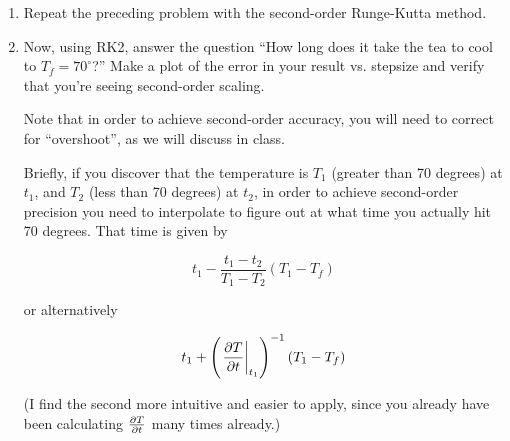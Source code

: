\documentclass[12pt]{article}
\def\PAR#1#2{ {{\partial #1}\over{\partial #2}} }
\begin{document}
\begin{enumerate}
\item{Repeat the preceding problem with the second-order Runge-Kutta method.}

\item{Now, using RK2, answer the question ``How long does it take the tea to cool to $T_f=70^\circ$?'' Make a plot of the error in your result vs. stepsize and verify that you're seeing second-order scaling. 

Note that in order to achieve second-order accuracy, you will need to correct for ``overshoot'', as we will discuss in class. 

Briefly, if you discover that the temperature is $T_1$ (greater than 70 degrees) at $t_1$, and $T_2$ (less than 70 degrees) at $t_2$, in order to achieve second-order precision you need to interpolate to figure out at what time you actually hit 70 degrees. That time is given by

\begin{equation}
t_1 - \frac{t_1-t_2}{T_1-T_2} (T_1-T_f)
\end{equation}

or alternatively

\begin{equation}
t_1 + \left(\left.\PAR{T}{t}\right|_{t_1}\right)^{-1} (T_1-T_f)
\end{equation}

(I find the second more intuitive and easier to apply, since you already have been calculating $\PAR{T}{t}$ many times already.)

}



\end{enumerate}
\end{document}
